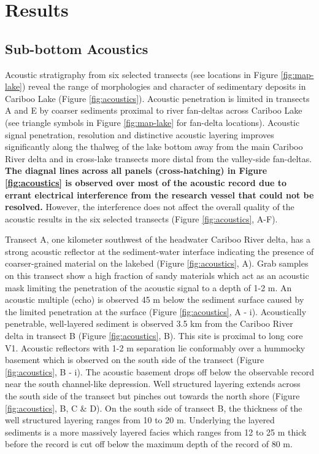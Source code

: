 \documentclass[Royal,times,doublespace,sageh]{sagej}
\begin{document}
\hypertarget{results}{%
\section{Results}\label{results}}

\hypertarget{sub-bottom-acoustics}{%
\subsection{Sub-bottom Acoustics}\label{sub-bottom-acoustics}}

Acoustic stratigraphy from six selected transects (see locations in
Figure \ref{fig:map-lake}) reveal the range of morphologies and
character of sedimentary deposits in Cariboo Lake (Figure
\ref{fig:acoustics}). Acoustic penetration is limited in transects A and
E by coarser sediments proximal to river fan-deltas across Cariboo Lake
(see triangle symbols in Figure \ref{fig:map-lake} for fan-delta
locations). Acoustic signal penetration, resolution and distinctive
acoustic layering improves significantly along the thalweg of the lake
bottom away from the main Cariboo River delta and in cross-lake
transects more distal from the valley-side fan-deltas. \textbf{The
diagnal lines across all panels (cross-hatching) in Figure
\ref{fig:acoustics} is observed over most of the acoustic record due to
errant electrical interference from the research vessel that could not
be resolved.} However, the interference does not affect the overall
quality of the acoustic results in the six selected transects (Figure
\ref{fig:acoustics}, A-F).

Transect A, one kilometer southwest of the headwater Cariboo River
delta, has a strong acoustic reflector at the sediment-water interface
indicating the presence of coarser-grained material on the lakebed
(Figure \ref{fig:acoustics}, A). Grab samples on this transect show a
high fraction of sandy materials which act as an acoustic mask limiting
the penetration of the acoustic signal to a depth of 1-2 m. An acoustic
multiple (echo) is observed 45 m below the sediment surface caused by
the limited penetration at the surface (Figure \ref{fig:acoustics}, A -
i). Acoustically penetrable, well-layered sediment is observed 3.5 km
from the Cariboo River delta in transect B (Figure \ref{fig:acoustics},
B). This site is proximal to long core V1. Acoustic reflectors with 1-2
m separation lie conformably over a hummocky basement which is observed
on the south side of the transect (Figure \ref{fig:acoustics}, B - i).
The acoustic basement drops off below the observable record near the
south channel-like depression. Well structured layering extends across
the south side of the transect but pinches out towards the north shore
(Figure \ref{fig:acoustics}, B, C \& D). On the south side of transect
B, the thickness of the well structured layering ranges from 10 to 20 m.
Underlying the layered sediments is a more massively layered facies
which ranges from 12 to 25 m thick before the record is cut off below
the maximum depth of the record of 80 m.
\end{document}
